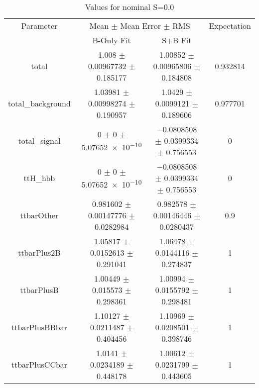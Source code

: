 \begin{table}
\centering
\caption{Values for nominal S=0.0}
\begin{tabular}{cccc}
\toprule
Parameter & \multicolumn{2}{c}{Mean $\pm$ Mean Error $\pm$ RMS} & Expectation\\
 & B-Only Fit & S+B Fit & \\
\midrule
total & \num{1.008} $\pm$ \num{0.00967732} $\pm$ \num{0.185177} & \num{1.00852} $\pm$ \num{0.00965806} $\pm$ \num{0.184808} & \num{0.932814}\\
total\_background & \num{1.03981} $\pm$ \num{0.00998274} $\pm$ \num{0.190957} & \num{1.0429} $\pm$ \num{0.0099121} $\pm$ \num{0.189606} & \num{0.977701}\\
total\_signal & \num{0} $\pm$ \num{0} $\pm$ \num{5.07652e-10} & \num{-0.0808508} $\pm$ \num{0.0399334} $\pm$ \num{0.756553} & \num{0}\\
ttH\_hbb & \num{0} $\pm$ \num{0} $\pm$ \num{5.07652e-10} & \num{-0.0808508} $\pm$ \num{0.0399334} $\pm$ \num{0.756553} & \num{0}\\
ttbarOther & \num{0.981602} $\pm$ \num{0.00147776} $\pm$ \num{0.0282984} & \num{0.982578} $\pm$ \num{0.00146446} $\pm$ \num{0.0280437} & \num{0.9}\\
ttbarPlus2B & \num{1.05817} $\pm$ \num{0.0152613} $\pm$ \num{0.291041} & \num{1.06478} $\pm$ \num{0.0144116} $\pm$ \num{0.274837} & \num{1}\\
ttbarPlusB & \num{1.00449} $\pm$ \num{0.015573} $\pm$ \num{0.298361} & \num{1.00994} $\pm$ \num{0.0155792} $\pm$ \num{0.298481} & \num{1}\\
ttbarPlusBBbar & \num{1.10127} $\pm$ \num{0.0211487} $\pm$ \num{0.404456} & \num{1.10969} $\pm$ \num{0.0208501} $\pm$ \num{0.398746} & \num{1}\\
ttbarPlusCCbar & \num{1.0141} $\pm$ \num{0.0234189} $\pm$ \num{0.448178} & \num{1.00612} $\pm$ \num{0.0231799} $\pm$ \num{0.443605} & \num{1}\\
\bottomrule
\end{tabular}
\end{table}